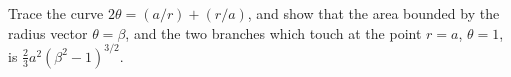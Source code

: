 Trace the curve $2\theta = (a/r) + (r/a)$, and show that the area bounded
by the radius vector $\theta = \beta$, and the two branches which touch at the point
$r = a$, $\theta = 1$, is $\frac{2}{3} a^{2}(\beta^{2} - 1)^{3/2}$. 

